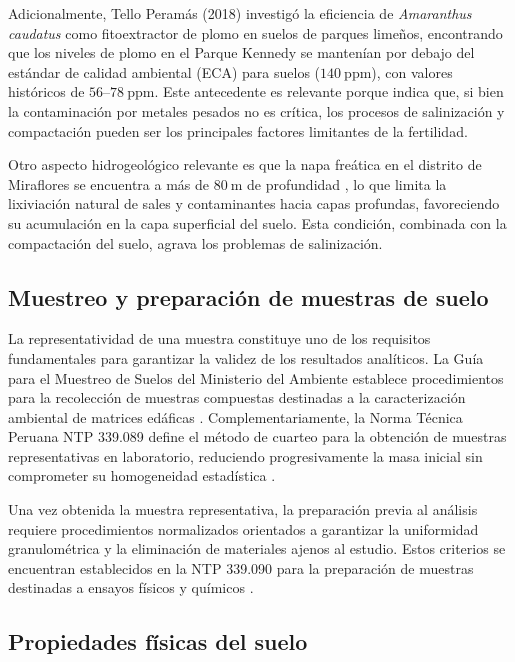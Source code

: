 \documentclass[fleqn]{jaes}
\begin{document}
Adicionalmente, Tello Peramás (2018) \cite{TelloPerams2018} investigó la eficiencia de \textit{Amaranthus caudatus} como fitoextractor de plomo en suelos de parques limeños, encontrando que los niveles de plomo en el Parque Kennedy se mantenían por debajo del estándar de calidad ambiental (ECA) para suelos ($140~\text{ppm}$), con valores históricos de $56$--$78~\text{ppm}$. Este antecedente es relevante porque indica que, si bien la contaminación por metales pesados no es crítica, los procesos de salinización y compactación pueden ser los principales factores limitantes de la fertilidad.

Otro aspecto hidrogeológico relevante es que la napa freática en el distrito de Miraflores se encuentra a más de $80~\text{m}$ de profundidad \cite{GerenciadeObrasPblicas2019}, lo que limita la lixiviación natural de sales y contaminantes hacia capas profundas, favoreciendo su acumulación en la capa superficial del suelo. Esta condición, combinada con la compactación del suelo, agrava los problemas de salinización.

\subsection{Muestreo y preparación de muestras de suelo}

La representatividad de una muestra constituye uno de los requisitos fundamentales para garantizar la validez de los resultados analíticos. La Guía para el Muestreo de Suelos del Ministerio del Ambiente establece procedimientos para la recolección de muestras compuestas destinadas a la caracterización ambiental de matrices edáficas \cite{DireccinGeneraldeCalidadAmbiental2014}. Complementariamente, la Norma Técnica Peruana NTP 339.089 define el método de cuarteo para la obtención de muestras representativas en laboratorio, reduciendo progresivamente la masa inicial sin comprometer su homogeneidad estadística \cite{INACAL2014}.

Una vez obtenida la muestra representativa, la preparación previa al análisis requiere procedimientos normalizados orientados a garantizar la uniformidad granulométrica y la eliminación de materiales ajenos al estudio. Estos criterios se encuentran establecidos en la NTP 339.090 para la preparación de muestras destinadas a ensayos físicos y químicos \cite{INACAL2021}.

\subsection{Propiedades físicas del suelo}
\end{document}
